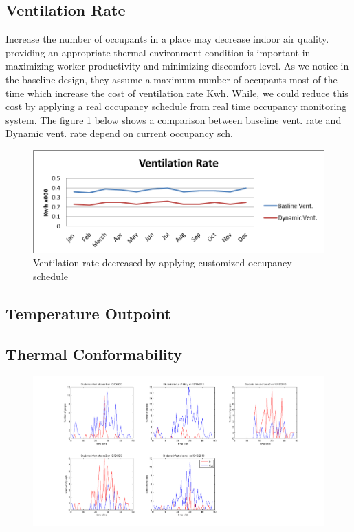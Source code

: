 \subsection{Ventilation Rate}
Increase the number of occupants in a place may decrease indoor air quality. providing an appropriate thermal environment condition is important in maximizing worker productivity and minimizing discomfort level. As we notice in the baseline design, they assume a maximum number of occupants most of the time which increase the cost of ventilation rate Kwh. While, we could reduce this cost by applying a real occupancy schedule from real time occupancy monitoring system. The figure \ref{fig:vntrate} below shows a comparison between baseline vent. rate and Dynamic vent. rate depend on current occupancy sch.

\begin{figure}[!ht]
  \centering
 	  	\includegraphics[width=0.9\columnwidth]{./images/vnt.png}
  \caption{Ventilation rate decreased by applying customized occupancy schedule}\label{fig:vntrate}
\end{figure}


\subsection{Temperature Outpoint}

\subsection{Thermal Conformability}

\begin{figure}[!ht]
  \centering
 	  	\includegraphics[width=1\columnwidth]{./images/inout.png}
\end{figure}

